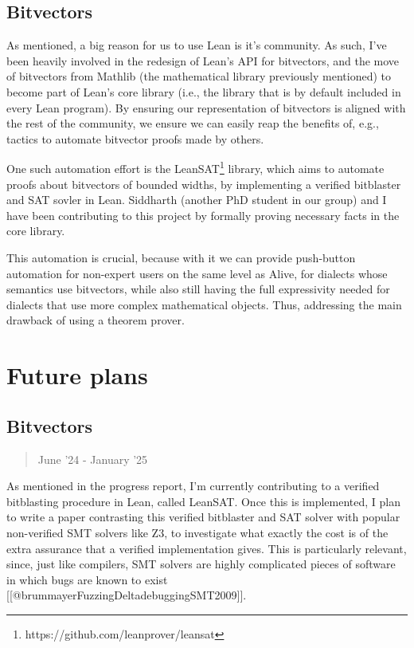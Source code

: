\documentclass[a4paper]{article}
\begin{document}
\hypertarget{bitvectors}{%
\subsection{Bitvectors}\label{bitvectors}}

As mentioned, a big reason for us to use Lean is it's community. As
such, I've been heavily involved in the redesign of Lean's API for
bitvectors, and the move of bitvectors from Mathlib (the mathematical
library previously mentioned) to become part of Lean's core library
(i.e., the library that is by default included in every Lean program).
By ensuring our representation of bitvectors is aligned with the rest of
the community, we ensure we can easily reap the benefits of, e.g.,
tactics to automate bitvector proofs made by others.

One such automation effort is the LeanSAT\footnote{https://github.com/leanprover/leansat}
library, which aims to automate proofs about bitvectors of bounded
widths, by implementing a verified bitblaster and SAT sovler in Lean.
Siddharth (another PhD student in our group) and I have been
contributing to this project by formally proving necessary facts in the
core library.

This automation is crucial, because with it we can provide push-button
automation for non-expert users on the same level as Alive, for dialects
whose semantics use bitvectors, while also still having the full
expressivity needed for dialects that use more complex mathematical
objects. Thus, addressing the main drawback of using a theorem prover.

\hypertarget{future-plans}{%
\section{Future plans}\label{future-plans}}

\hypertarget{bitvectors-1}{%
\subsection{Bitvectors}\label{bitvectors-1}}

\begin{quote}
June '24 - January '25
\end{quote}

As mentioned in the progress report, I'm currently contributing to a
verified bitblasting procedure in Lean, called LeanSAT. Once this is
implemented, I plan to write a paper contrasting this verified
bitblaster and SAT solver with popular non-verified SMT solvers like Z3,
to investigate what exactly the cost is of the extra assurance that a
verified implementation gives. This is particularly relevant, since,
just like compilers, SMT solvers are highly complicated pieces of
software in which bugs are known to exist
{[}{[}@brummayerFuzzingDeltadebuggingSMT2009{]}{]}.
\end{document}
